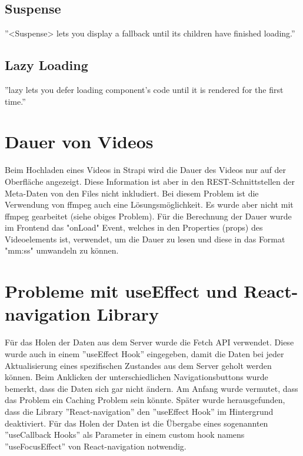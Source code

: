 \subsection{Suspense}\label{subsec:suspense}
''<Suspense> lets you display a fallback until its children have finished loading.''\cite{suspense}

\subsection{Lazy Loading}\label{subsec:lazy-loading}
''lazy lets you defer loading component’s code until it is rendered for
the first time.''\cite{lazyLoading}


\section{Dauer von Videos}\label{sec:dauer-von-videos}

Beim Hochladen eines Videos in Strapi
wird die Dauer des Videos nur auf der Oberfläche angezeigt.
Diese Information ist aber in den REST-Schnittstellen der Meta-Daten von den Files nicht inkludiert.
Bei diesem Problem ist die Verwendung von ffmpeg auch eine Lösungsmöglichkeit.
Es wurde aber nicht mit ffmpeg gearbeitet (siehe obiges Problem).
Für die Berechnung der Dauer wurde im Frontend das "onLoad" Event,
welches in den Properties (props) des Videoelements ist, verwendet,
um die Dauer zu lesen und diese in das Format "mm:ss" umwandeln zu können.





\section{Probleme mit useEffect und React-navigation Library}\label{sec:probleme-mit-useeffect-und-react-navigation-library}
Für das Holen der Daten aus dem Server wurde die Fetch API verwendet.
Diese wurde auch in einem ''useEffect Hook'' eingegeben, damit die Daten bei jeder Aktualisierung eines spezifischen
Zustandes aus dem Server geholt werden können.
Beim Anklicken der unterschiedlichen Navigationsbuttons wurde bemerkt,
dass die Daten sich gar nicht ändern.
Am Anfang wurde vermutet, dass das Problem ein Caching Problem sein könnte.
Später wurde herausgefunden, dass die Library ''React-navigation'' den ''useEffect Hook'' im Hintergrund deaktiviert.
Für das Holen der Daten ist die Übergabe eines sogenannten
''useCallback Hooks'' als Parameter in einem custom hook namens ''useFocusEffect''
von React-navigation notwendig.\cite{issuesWithUseEffect}



